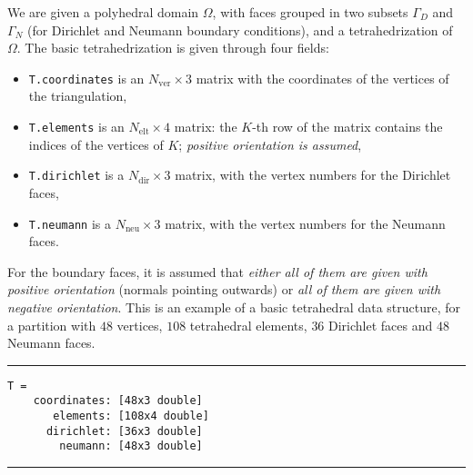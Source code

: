 \documentclass[10pt,english]{article}
\newcommand{\oneline}{\vspace{0.4cm}\hrule\vspace{0.4cm}}
\newcommand{\Nelt}{{N_{\mathrm{elt}}}}
\newcommand{\Ndir}{{N_{\mathrm{dir}}}}
\newcommand{\Nneu}{{N_{\mathrm{neu}}}}
\begin{document}
We are given a polyhedral domain $\Omega$, with faces grouped in two subsets $\Gamma_D$ and $\Gamma_N$ (for Dirichlet and Neumann boundary conditions), and a tetrahedrization of $\Omega$. The basic tetrahedrization is given through four fields:
\begin{itemize}
\item {\tt T.coordinates} is an $N_{\mathrm{ver}}\times 3$ matrix with the coordinates of the vertices of the triangulation,
\item {\tt T.elements} is an $\Nelt\times 4$ matrix: the $K$-th row of the matrix contains the indices of the vertices of $K$; {\em positive orientation is assumed},
\item {\tt T.dirichlet} is a $\Ndir\times 3$ matrix, with the vertex numbers for the Dirichlet faces,
\item {\tt T.neumann} is a $\Nneu\times 3$ matrix, with the vertex numbers for the Neumann faces.
\end{itemize}
For the boundary faces, it is assumed that {\em either all of them are given with positive orientation} (normals pointing outwards) or {\em all of them are given with negative orientation}. This is an example of a basic tetrahedral data structure, for a partition with $48$ vertices, $108$ tetrahedral elements, $36$ Dirichlet faces and $48$ Neumann faces.

\oneline
\begin{verbatim}
T = 
    coordinates: [48x3 double]
       elements: [108x4 double]
      dirichlet: [36x3 double]
        neumann: [48x3 double]
\end{verbatim}
\oneline
\end{document}
